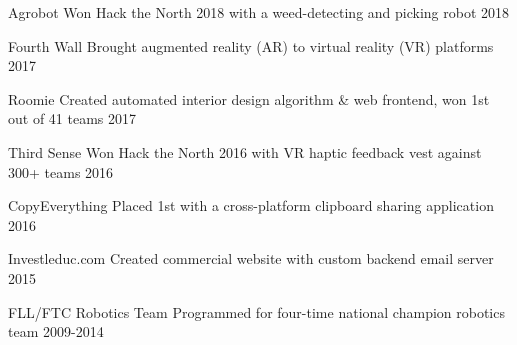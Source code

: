 


\begin{cvhonors}

\cvhonor
{Agrobot} %
{Won Hack the North 2018 with a weed-detecting and picking robot} %
{} %
{2018} %

\cvhonor
{Fourth Wall} %
{Brought augmented reality (AR) to virtual reality (VR) platforms} %
{} %
{2017} %

\cvhonor
{Roomie} %
{Created automated interior design algorithm \& web frontend, won 1st out of 41 teams} %
{} %
{2017} %

\cvhonor
{Third Sense} %
{Won Hack the North 2016 with VR haptic feedback vest against 300+ teams} %
{} %
{2016} %

\cvhonor
{CopyEverything} %
{Placed 1st with a cross-platform clipboard sharing application} %
{} %
{2016} %

\cvhonor
{Investleduc.com} %
{Created commercial website with custom backend email server} %
{} %
{2015} %

\cvhonor
{FLL/FTC Robotics Team} %
{Programmed for four-time national champion robotics team} %
{} %
{2009-2014} %


\end{cvhonors}
